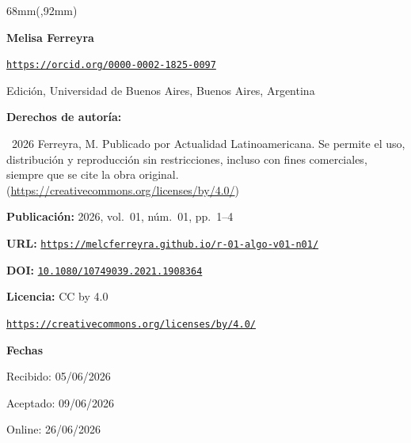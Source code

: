 \begin{textblock*}{68mm}(\gbbloquex,92mm)
{\setlength{\leftskip}{0pt}\setlength{\parindent}{0pt}%
\noindent\begin{minipage}[t]{68mm}
\sffamily\small\setlength{\parskip}{1pt}
{\bfseries\color{azulrevista}Melisa Ferreyra}\par
{\scriptsize\texttt{\href{https://orcid.org/0000-0002-1825-0097}{https://orcid.org/0000-0002-1825-0097}}}\par
Edición, Universidad de Buenos Aires, Buenos Aires, Argentina\par
\vspace{6pt}
{\bfseries\color{azulrevista!70}Derechos de autor\'ia:}\par
\textcopyright\ 2026 Ferreyra, M. Publicado por Actualidad Latinoamericana. Se permite el uso, distribución y reproducción sin restricciones, incluso con fines comerciales, siempre que se cite la obra original. (\href{https://creativecommons.org/licenses/by/4.0/}{https://creativecommons.org/licenses/by/4.0/})\par\vspace{6pt}
{\bfseries\color{azulrevista!70}Publicación:} 2026, vol.~01, n\'um.~01, pp.~1--4\par\vspace{6pt}
{\bfseries\color{azulrevista!70}URL:} {\scriptsize\texttt{\href{https://melcferreyra.github.io/r-01-algo-v01-n01/}{https://melcferreyra.github.io/r-01-algo-v01-n01/}}}\par\vspace{6pt}
{\bfseries\color{azulrevista!70}DOI:} {\scriptsize\texttt{\href{https://doi.org/10.1080/10749039.2021.1908364}{10.1080/10749039.2021.1908364}}}\par\vspace{6pt}
{\bfseries\color{azulrevista!70}Licencia:} CC by 4.0\par
{\scriptsize\texttt{\href{https://creativecommons.org/licenses/by/4.0/}{https://creativecommons.org/licenses/by/4.0/}}}\par
\vspace{6pt}
{\bfseries\color{azulrevista!70}Fechas}\par\vspace{2pt}
Recibido: 05/06/2026\par
Aceptado: 09/06/2026\par
Online: 26/06/2026\par
\vspace{6pt}
\vspace{6pt}

\end{minipage}}
\end{textblock*}
